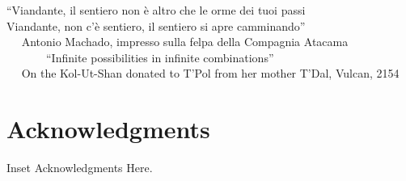 
\begin{flushright}
``Viandante, il sentiero non \`e altro che le orme dei tuoi passi \\
 Viandante, non c'\`e sentiero, il sentiero si apre camminando''\\ \,\,\,\,\,\,
\scriptsize
Antonio Machado, impresso sulla felpa della Compagnia Atacama \\ \,\,\,\,\,\,\,\,\,\,\,\,\,\,\,\,\,\,\,
\normalsize
``Infinite possibilities in infinite combinations'' \\ \,\,\,\,\,\,
\scriptsize
On the Kol-Ut-Shan donated to T'Pol from her mother T'Dal, Vulcan, 2154
\end{flushright}

\section*{Acknowledgments}
\lhead[\fancyplain{}{\thepage}]{\fancyplain{}{\rightmark}}
 \thispagestyle{plain}


	Inset Acknowledgments Here.

